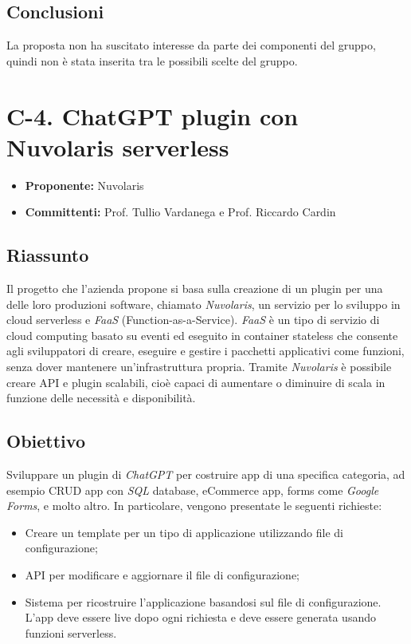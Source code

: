 \documentclass{article}
\begin{document}
\subsection{Conclusioni}
La proposta non ha suscitato interesse da parte dei componenti del gruppo, quindi non è stata inserita tra le possibili scelte del gruppo.

\newpage

\section{C-4. ChatGPT plugin con Nuvolaris serverless}
\begin{itemize}
    \item \textbf{Proponente:} Nuvolaris
    \item \textbf{Committenti:}  Prof. Tullio Vardanega e Prof. Riccardo Cardin
\end{itemize}

\subsection{Riassunto}
Il progetto che l’azienda propone si basa sulla creazione di un plugin per una delle loro produzioni software, chiamato \textit{Nuvolaris}, un servizio per lo sviluppo in cloud serverless e \textit{FaaS} (Function-as-a-Service). 
\textit{FaaS} è un tipo di servizio di cloud computing basato su eventi ed eseguito in container stateless che consente agli sviluppatori di creare, eseguire e gestire i pacchetti applicativi come funzioni, senza dover mantenere un'infrastruttura propria.
Tramite \textit{Nuvolaris} è possibile creare API e plugin scalabili, cioè capaci di aumentare o diminuire di scala in funzione delle necessità e disponibilità.


\subsection{Obiettivo}
Sviluppare un plugin di \textit{ChatGPT} per costruire app di una specifica categoria, ad esempio CRUD app con \textit{SQL} database, eCommerce app, forms come \textit{Google Forms}, e molto altro.
In particolare, vengono presentate le seguenti richieste:

\begin{itemize}
  \item Creare un template per un tipo di applicazione utilizzando file di configurazione;
  \item API per modificare e aggiornare il file di configurazione;
  \item Sistema per ricostruire l’applicazione basandosi sul file di configurazione. L’app deve essere live dopo ogni richiesta e deve essere generata usando funzioni serverless.

\end{itemize}
\end{document}
